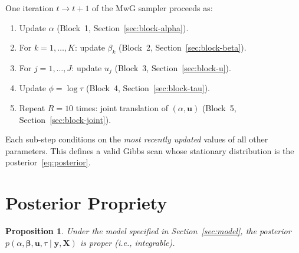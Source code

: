 \documentclass[11pt]{article}
\newtheorem{proposition}{Proposition}
\newcommand{\bX}{\bm{X}}
\newcommand{\by}{\bm{y}}
\newcommand{\bbeta}{\bm{\beta}}
\newcommand{\bu}{\bm{u}}
\begin{document}
One iteration $t \to t+1$ of the MwG sampler proceeds as:
\begin{enumerate}
  \item Update $\alpha$ (Block~1, Section~\ref{sec:block-alpha}).
  \item For $k = 1,\dots,K$: update $\beta_k$ (Block~2, Section~\ref{sec:block-beta}).
  \item For $j = 1,\dots,J$: update $u_j$ (Block~3, Section~\ref{sec:block-u}).
  \item Update $\phi = \log\tau$ (Block~4, Section~\ref{sec:block-tau}).
  \item Repeat $R = 10$ times: joint translation of $(\alpha, \bu)$ (Block~5, Section~\ref{sec:block-joint}).
\end{enumerate}
Each sub-step conditions on the \emph{most recently updated} values of
all other parameters. This defines a valid Gibbs scan whose stationary
distribution is the posterior~\eqref{eq:posterior}.

\section{Posterior Propriety}
\label{sec:propriety}

\begin{proposition}
Under the model specified in Section~\ref{sec:model}, the posterior
$p(\alpha,\bbeta,\bu,\tau \mid \by,\bX)$ is proper (i.e., integrable).
\end{proposition}
\end{document}
